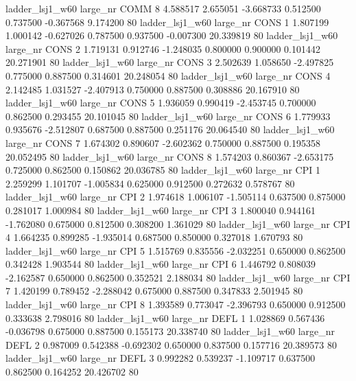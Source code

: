     ladder_lsj1_w60   large_nr     COMM                 8  4.588517  2.655051  -3.668733 0.512500 0.737500 -0.367568    9.174200 80
    ladder_lsj1_w60   large_nr     CONS                 1  1.807199  1.000142  -0.627026 0.787500 0.937500 -0.007300   20.339819 80
    ladder_lsj1_w60   large_nr     CONS                 2  1.719131  0.912746  -1.248035 0.800000 0.900000  0.101442   20.271901 80
    ladder_lsj1_w60   large_nr     CONS                 3  2.502639  1.058650  -2.497825 0.775000 0.887500  0.314601   20.248054 80
    ladder_lsj1_w60   large_nr     CONS                 4  2.142485  1.031527  -2.407913 0.750000 0.887500  0.308886   20.167910 80
    ladder_lsj1_w60   large_nr     CONS                 5  1.936059  0.990419  -2.453745 0.700000 0.862500  0.293455   20.101045 80
    ladder_lsj1_w60   large_nr     CONS                 6  1.779933  0.935676  -2.512807 0.687500 0.887500  0.251176   20.064540 80
    ladder_lsj1_w60   large_nr     CONS                 7  1.674302  0.890607  -2.602362 0.750000 0.887500  0.195358   20.052495 80
    ladder_lsj1_w60   large_nr     CONS                 8  1.574203  0.860367  -2.653175 0.725000 0.862500  0.150862   20.036785 80
    ladder_lsj1_w60   large_nr      CPI                 1  2.259299  1.101707  -1.005834 0.625000 0.912500  0.272632    0.578767 80
    ladder_lsj1_w60   large_nr      CPI                 2  1.974618  1.006107  -1.505114 0.637500 0.875000  0.281017    1.000984 80
    ladder_lsj1_w60   large_nr      CPI                 3  1.800040  0.944161  -1.762080 0.675000 0.812500  0.308200    1.361029 80
    ladder_lsj1_w60   large_nr      CPI                 4  1.664235  0.899285  -1.935014 0.687500 0.850000  0.327018    1.670793 80
    ladder_lsj1_w60   large_nr      CPI                 5  1.515769  0.835556  -2.032251 0.650000 0.862500  0.342428    1.903544 80
    ladder_lsj1_w60   large_nr      CPI                 6  1.446792  0.808039  -2.162587 0.650000 0.862500  0.352521    2.188034 80
    ladder_lsj1_w60   large_nr      CPI                 7  1.420199  0.789452  -2.288042 0.675000 0.887500  0.347833    2.501945 80
    ladder_lsj1_w60   large_nr      CPI                 8  1.393589  0.773047  -2.396793 0.650000 0.912500  0.333638    2.798016 80
    ladder_lsj1_w60   large_nr     DEFL                 1  1.028869  0.567436  -0.036798 0.675000 0.887500  0.155173   20.338740 80
    ladder_lsj1_w60   large_nr     DEFL                 2  0.987009  0.542388  -0.692302 0.650000 0.837500  0.157716   20.389573 80
    ladder_lsj1_w60   large_nr     DEFL                 3  0.992282  0.539237  -1.109717 0.637500 0.862500  0.164252   20.426702 80
